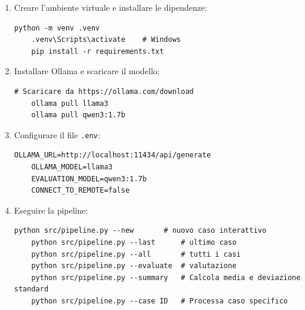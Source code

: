 \documentclass[11pt]{report}
\begin{document}
\begin{appendices}
\begin{enumerate}
        \item Creare l'ambiente virtuale e installare le dipendenze:
        \begin{lstlisting}[style=pythonstyle]
    python -m venv .venv
    .venv\Scripts\activate    # Windows
    pip install -r requirements.txt
        \end{lstlisting}
        
        \item Installare Ollama e scaricare il modello:
        \begin{lstlisting}[style=pythonstyle]
    # Scaricare da https://ollama.com/download
    ollama pull llama3
    ollama pull qwen3:1.7b
        \end{lstlisting}
        
        \item Configurare il file \texttt{.env}:
        \begin{lstlisting}[style=pythonstyle]
    OLLAMA_URL=http://localhost:11434/api/generate
    OLLAMA_MODEL=llama3
    EVALUATION_MODEL=qwen3:1.7b
    CONNECT_TO_REMOTE=false
        \end{lstlisting}
        
        \item Eseguire la pipeline:
        \begin{lstlisting}[style=pythonstyle]
    python src/pipeline.py --new       # nuovo caso interattivo
    python src/pipeline.py --last      # ultimo caso
    python src/pipeline.py --all       # tutti i casi
    python src/pipeline.py --evaluate  # valutazione
    python src/pipeline.py --summary   # Calcola media e deviazione standard
    python src/pipeline.py --case ID   # Processa caso specifico
        \end{lstlisting}
    \end{enumerate}


\end{appendices}


 
\end{document}
